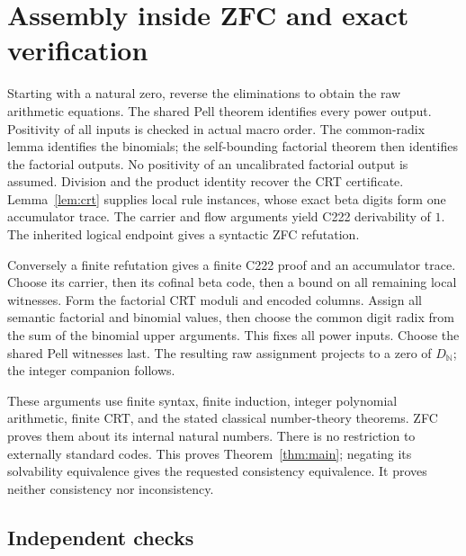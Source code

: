\documentclass[11pt,letterpaper]{article}
\newcommand{\N}{\mathbb N}
\theoremstyle{definition}\newtheorem{definition}[theorem]{Definition}
\theoremstyle{remark}\newtheorem{remark}[theorem]{Remark}
\begin{document}
\section{Assembly inside ZFC and exact verification}\label{sec:assembly}

Starting with a natural zero, reverse the eliminations to obtain the
raw arithmetic equations. The shared Pell theorem identifies every
power output. Positivity of all inputs is checked in actual macro order.
The common-radix lemma identifies the binomials; the self-bounding
factorial theorem then identifies the factorial outputs. No positivity
of an uncalibrated factorial output is assumed.
Division and the product identity recover the CRT certificate.
Lemma~\ref{lem:crt} supplies local rule instances, whose exact beta
digits form one accumulator trace. The carrier and flow arguments
yield C222 derivability of $1$. The inherited logical endpoint gives
a syntactic ZFC refutation.

Conversely a finite refutation gives a finite C222 proof and an
accumulator trace. Choose its carrier, then its cofinal beta code,
then a bound on all remaining local witnesses. Form the factorial
CRT moduli and encoded columns. Assign all semantic factorial and
binomial values, then choose the common digit radix from the sum of
the binomial upper arguments. This fixes all power inputs.
Choose the shared Pell witnesses last. The resulting raw assignment
projects to a zero of $D_{\N}$; the integer companion follows.

These arguments use finite syntax, finite induction, integer
polynomial arithmetic, finite CRT, and the stated classical
number-theory theorems. ZFC proves them about its internal natural
numbers. There is no restriction to externally standard codes.
This proves Theorem~\ref{thm:main}; negating its solvability equivalence
gives the requested consistency equivalence. It proves neither
consistency nor inconsistency.

\subsection{Independent checks}
\end{document}
